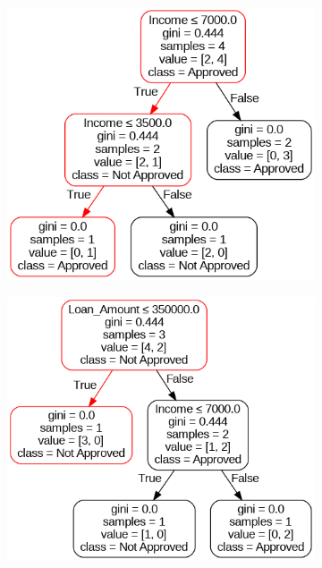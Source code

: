 \begin{figure}[H]
  \centering
  \begin{subfigure}{0.45\linewidth}
    \includegraphics[width=\linewidth]{graphics/loan_RF_1.png}
    \caption{}
    \label{fig:rfTree0}
  \end{subfigure}
  \hspace{0.06\linewidth}
  \begin{subfigure}{0.45\linewidth}
    \includegraphics[width=\linewidth]{graphics/loan_RF_2.png}

\end{subfigure}
\end{figure}
